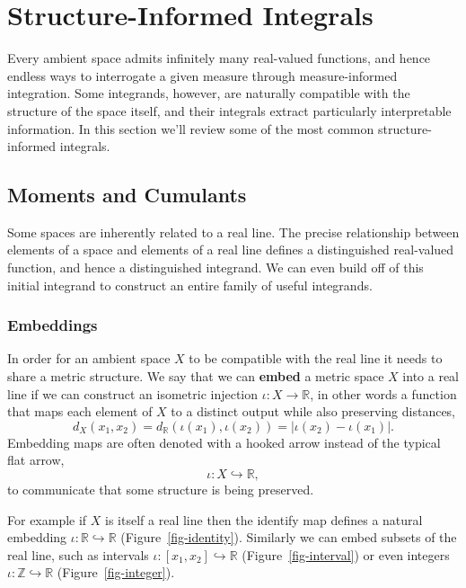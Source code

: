 \documentclass[
  letterpaper,
  DIV=11,
  numbers=noendperiod]{scrartcl}
\begin{document}
\hypertarget{structure-informed-integrals}{%
\section{Structure-Informed
Integrals}\label{structure-informed-integrals}}

Every ambient space admits infinitely many real-valued functions, and
hence endless ways to interrogate a given measure through
measure-informed integration. Some integrands, however, are naturally
compatible with the structure of the space itself, and their integrals
extract particularly interpretable information. In this section we'll
review some of the most common structure-informed integrals.

\hypertarget{moments-and-cumulants}{%
\subsection{Moments and Cumulants}\label{moments-and-cumulants}}

Some spaces are inherently related to a real line. The precise
relationship between elements of a space and elements of a real line
defines a distinguished real-valued function, and hence a distinguished
integrand. We can even build off of this initial integrand to construct
an entire family of useful integrands.

\hypertarget{embeddings}{%
\subsubsection{Embeddings}\label{embeddings}}

In order for an ambient space \(X\) to be compatible with the real line
it needs to share a metric structure. We say that we can \textbf{embed}
a metric space \(X\) into a real line if we can construct an isometric
injection \(\iota : X \rightarrow \mathbb{R}\), in other words a
function that maps each element of \(X\) to a distinct output while also
preserving distances, \[
d_{X}(x_{1}, x_{2})
= d_{\mathbb{R}}(\iota(x_{1}), \iota(x_{2}))
= | \iota(x_{2}) - \iota(x_{1}) |.
\] Embedding maps are often denoted with a hooked arrow instead of the
typical flat arrow, \[
\iota : X \hookrightarrow \mathbb{R},
\] to communicate that some structure is being preserved.

For example if \(X\) is itself a real line then the identify map defines
a natural embedding \(\iota : \mathbb{R} \hookrightarrow \mathbb{R}\)
(Figure~\ref{fig-identity}). Similarly we can embed subsets of the real
line, such as intervals
\(\iota : [x_{1}, x_{2}] \hookrightarrow \mathbb{R}\)
(Figure~\ref{fig-interval}) or even integers
\(\iota : \mathbb{Z} \hookrightarrow \mathbb{R}\)
(Figure~\ref{fig-integer}).
\end{document}
